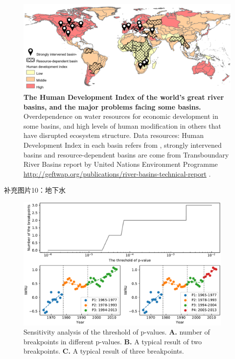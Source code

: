 \documentclass[9pt,twoside,lineno]{pnas-new}
\begin{document}
\begin{figure}%
	\centering
	\includegraphics[width=\linewidth]{../../figures/main/map.pdf}
	\caption{
		\textbf{The Human Development Index of the world's great river basins, and the major problems facing some basins.}
		Overdependence on water resources for economic development in some basins, and high levels of human modification in others that have disrupted ecosystem structure. Data resources: Human Development Index in each basin refers from \cite{linkeGlobalHydroenvironmentalSubbasin2019}, strongly intervened basins and resource-dependent basins are come from Transboundary River Basins report by United Nations Environment Programme \url{http://geftwap.org/publications/river-basins-technical-report} \cite{unep-dhiTransboundaryRiverBasins2016}.
	}
	\label{fig:traps}
\end{figure}

补充图片10：地下水
\begin{figure}
    \centering
    \includegraphics[width=0.95\textwidth]{../../figures/sup/sensitivity.pdf}
    \caption{
        Sensitivity analysis of the threshold of p-values. 
        \textbf{A.} number of breakpoints in different p-values.
        \textbf{B.} A typical result of two breakpoints.
        \textbf{C.} A typical result of three breakpoints.
    }
\end{figure}
\end{document}
